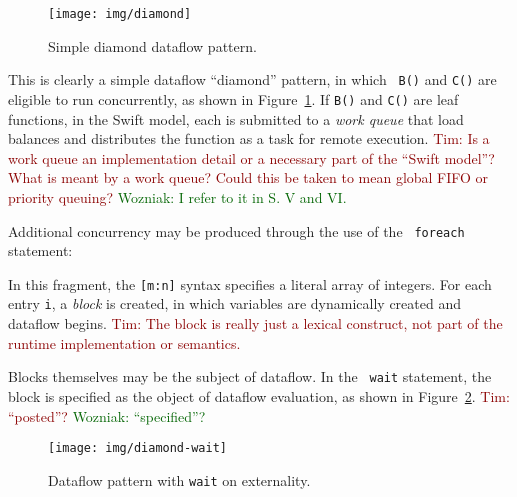 \documentclass[conference,10pt]{IEEEtran}
\newcommand{\woz}[1]{ {\textcolor{darkgreen} { Wozniak: #1 }}}
\newcommand{\arm}[1]{ {\textcolor{darkred} { Tim: #1 }}}
\newcommand{\woz}[1]{}
\newcommand{\arm}[1]{}
\begin{document}
\begin{figure}[h]
  \begin{minipage}[b]{0.45\linewidth}
    
    \vspace{0.4cm}
  \end{minipage} 
  \hspace{0.1cm}
  \begin{minipage}[b]{0.45\linewidth}
    \texttt{[image: img/diamond]}
    \vspace{-0.0cm}
  \end{minipage}
  \caption{Simple diamond dataflow pattern.
    \label{figure:diamond}}
\end{figure}

This is clearly a simple dataflow ``diamond'' pattern, in which {\tt
  B()} and {\tt C()} are eligible to run concurrently, as shown in
Figure~\ref{figure:diamond}.  If {\tt B()} and {\tt C()} are leaf
functions, in the Swift model, each is submitted to a
\emph{work queue} that load balances and distributes the function as a
task for remote execution.
\arm{Is a work queue an implementation detail or a necessary
    part of the ``Swift model''?  What is meant by a work queue?
    Could this be taken to mean global FIFO or priority queuing?}
\woz{I refer to it in S. V and VI.}

Additional concurrency may be produced through the use of the {\tt
  foreach} statement: 

In this fragment, the {\tt [m:n]} syntax specifies a literal array of
integers.  For each entry {\tt i}, a \emph{block} is created, in
which variables are dynamically created and dataflow 
begins.  \arm{The block is really just a lexical construct, not part
of the runtime implementation or semantics.}

Blocks themselves may be the subject of dataflow.  In the {\tt
  wait} statement, the block is specified as the object of dataflow
evaluation, as shown in Figure~\ref{figure:diamond-wait}.
\arm{``posted''?}
\woz{``specified''?}
\begin{figure}[h]
  \begin{minipage}[b]{0.45\linewidth}
    
    \vspace{0.2cm}
  \end{minipage} 
  \hspace{0.1cm}
  \begin{minipage}[b]{0.45\linewidth}
    \texttt{[image: img/diamond-wait]}
    \vspace{0.1cm}
  \end{minipage}
  \caption{Dataflow pattern with {\tt wait} on externality.
    \label{figure:diamond-wait}}
\end{figure}
\end{document}
